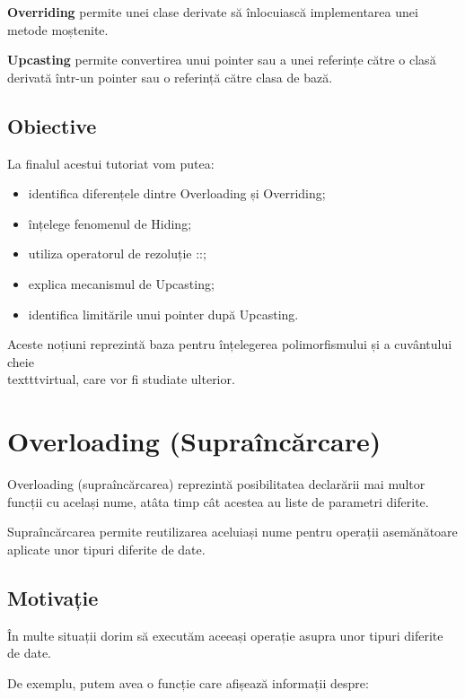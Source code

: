 \documentclass[12pt,a4paper]{article}
\begin{document}
\textbf{Overriding} permite unei clase derivate să înlocuiască implementarea unei metode moștenite.

\textbf{Upcasting} permite convertirea unui pointer sau a unei referințe către o clasă derivată într-un pointer sau o referință către clasa de bază.

\subsection{Obiective}

La finalul acestui tutoriat vom putea:

\begin{itemize}
\item identifica diferențele dintre Overloading și Overriding;
\item înțelege fenomenul de Hiding;
\item utiliza operatorul de rezoluție ::;
\item explica mecanismul de Upcasting;
\item identifica limitările unui pointer după Upcasting.
\end{itemize}

Aceste noțiuni reprezintă baza pentru înțelegerea polimorfismului și a cuvântului cheie \\texttt{virtual}, care vor fi studiate ulterior. 








\section{Overloading (Supraîncărcare)}

Overloading (supraîncărcarea) reprezintă posibilitatea declarării mai multor funcții cu același nume, atâta timp cât acestea au liste de parametri diferite.

Supraîncărcarea permite reutilizarea aceluiași nume pentru operații asemănătoare aplicate unor tipuri diferite de date.

\subsection{Motivație}

În multe situații dorim să executăm aceeași operație asupra unor tipuri diferite de date.

De exemplu, putem avea o funcție care afișează informații despre:
\end{document}
